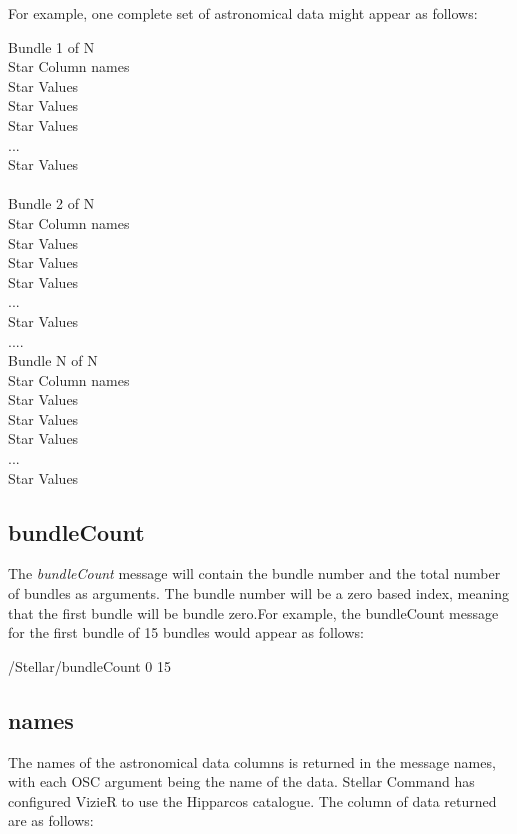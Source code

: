 For example, one complete set of astronomical data might appear as follows:

\begin{syntax}
	Bundle 1 of N\\
	Star Column names\\
	Star Values \\
	Star Values \\
	Star Values \\
	...\\
	Star Values \\
	\\
	Bundle 2 of N\\
	Star Column names\\
	Star Values \\
	Star Values \\
	Star Values \\
	...\\
	Star Values \\
	
	....\\
	Bundle N of N\\
	Star Column names\\
	Star Values \\
	Star Values \\
	Star Values \\
	...\\
	Star Values \\
	
\end{syntax}

\subsection{bundleCount}
The \textit{bundleCount} message will contain the bundle number and the total number of bundles as arguments. The bundle number will be a zero based index, meaning that the first bundle will be bundle zero.For example, the bundleCount message for the first bundle of 15 bundles would appear as follows:

\begin{syntax}
	/Stellar/bundleCount 0 15
\end{syntax}
\bigskip

\subsection{names}
The names of the astronomical data columns is returned in the message names, with each OSC argument being the name of the  data. Stellar Command has configured VizieR to use the Hipparcos catalogue. The column of data returned are as follows: 


